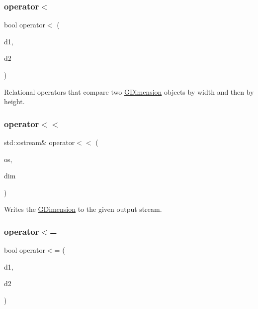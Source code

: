 \subsubsection{\texorpdfstring{operator$<$}{operator<}}
{\footnotesize\ttfamily bool operator$<$ (\begin{DoxyParamCaption}\item[{const \mbox{\hyperlink{classGDimension}{G\+Dimension}} \&}]{d1,  }\item[{const \mbox{\hyperlink{classGDimension}{G\+Dimension}} \&}]{d2 }\end{DoxyParamCaption})\hspace{0.3cm}{\ttfamily [friend]}}



Relational operators that compare two \mbox{\hyperlink{classGDimension}{G\+Dimension}} objects by width and then by height. 

\mbox{\label{classGDimension_a528e8a99e8c635db2eab715975ad0e8d}} 
\subsubsection{\texorpdfstring{operator$<$$<$}{operator<<}}
{\footnotesize\ttfamily std\+::ostream\& operator$<$$<$ (\begin{DoxyParamCaption}\item[{std\+::ostream \&}]{os,  }\item[{const \mbox{\hyperlink{classGDimension}{G\+Dimension}} \&}]{dim }\end{DoxyParamCaption})\hspace{0.3cm}{\ttfamily [friend]}}



Writes the \mbox{\hyperlink{classGDimension}{G\+Dimension}} to the given output stream. 

\mbox{\label{classGDimension_af6f17bbe9041aee1572fc7be059bec62}} 
\subsubsection{\texorpdfstring{operator$<$=}{operator<=}}
{\footnotesize\ttfamily bool operator$<$= (\begin{DoxyParamCaption}\item[{const \mbox{\hyperlink{classGDimension}{G\+Dimension}} \&}]{d1,  }\item[{const \mbox{\hyperlink{classGDimension}{G\+Dimension}} \&}]{d2 }\end{DoxyParamCaption})\hspace{0.3cm}{\ttfamily [friend]}}



